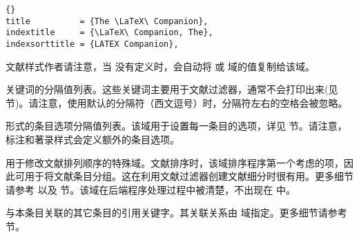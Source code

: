 \begin{fieldlist}
\begin{lstlisting}[style=bibtex]{}
title          = {The \LaTeX\ Companion},
indextitle     = {\LaTeX\ Companion, The},
indexsorttitle = {LATEX Companion},
\end{lstlisting}
%
文献样式作者请注意，当  没有定义时，\biblatex 会自动将  或  域的值复制给该域。



关键词的分隔值列表。这些关键词主要用于文献过滤器，通常不会打印出来(见 节)。请注意，使用默认的分隔符（西文逗号）时，分隔符左右的空格会被忽略。


\keyval 形式的条目选项分隔值列表。该域用于设置每一条目的选项，详见  节。请注意，标注和著录样式会定义额外的条目选项。

用于修改文献排列顺序的特殊域。文献排序时，该域排序程序第一个考虑的项，因此可用于将文献条目分组。这在利用文献过滤器创建文献细分时很有用。更多细节请参考  以及  节。该域在后端程序处理过程中被清楚，不出现在  中。


与本条目关联的其它条目的引用关键字。其关联关系由  域指定。更多细节请参考  节。



\end{fieldlist}
